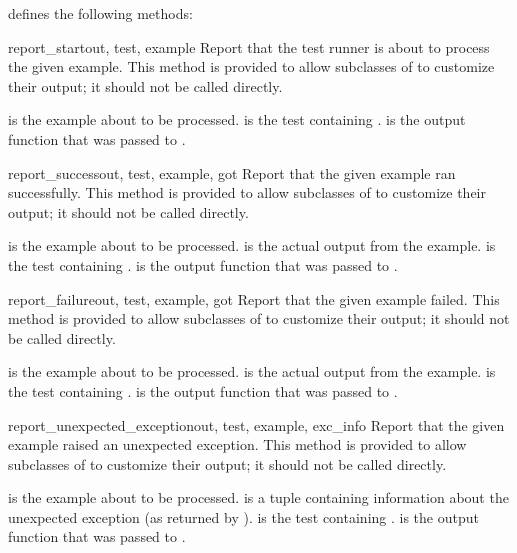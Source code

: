  defines the following methods:

\begin{methoddesc}{report_start}{out, test, example}
    Report that the test runner is about to process the given example.
    This method is provided to allow subclasses of
     to customize their output; it should not be
    called directly.

     is the example about to be processed.   is
    the test containing .   is the output
    function that was passed to .
\end{methoddesc}

\begin{methoddesc}{report_success}{out, test, example, got}
    Report that the given example ran successfully.  This method is
    provided to allow subclasses of  to customize
    their output; it should not be called directly.

     is the example about to be processed.   is
    the actual output from the example.   is the test
    containing .   is the output function that
    was passed to .
\end{methoddesc}

\begin{methoddesc}{report_failure}{out, test, example, got}
    Report that the given example failed.  This method is provided to
    allow subclasses of  to customize their
    output; it should not be called directly.

     is the example about to be processed.   is
    the actual output from the example.   is the test
    containing .   is the output function that
    was passed to .
\end{methoddesc}

\begin{methoddesc}{report_unexpected_exception}{out, test, example, exc_info}
    Report that the given example raised an unexpected exception.
    This method is provided to allow subclasses of
     to customize their output; it should not be
    called directly.

     is the example about to be processed.
     is a tuple containing information about the
    unexpected exception (as returned by ).
     is the test containing .   is the
    output function that was passed to .
\end{methoddesc}

